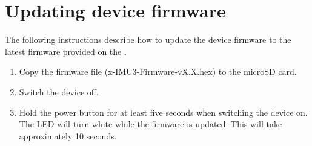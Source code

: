 \section{Updating device firmware}
\label{sec:updatingDeviceFirmware}

The following instructions describe how to update the device firmware to the latest firmware provided on the \productWebPage{}.

\begin{enumerate}
\item Copy the firmware file (x-IMU3-Firmware-vX.X.hex) to the \ac{microSD} card.
\item Switch the device off.
\item Hold the power button for at least five seconds when switching the device on.  The \ac{LED} will turn white while the firmware is updated.  This will take approximately 10 seconds.
\end{enumerate}
